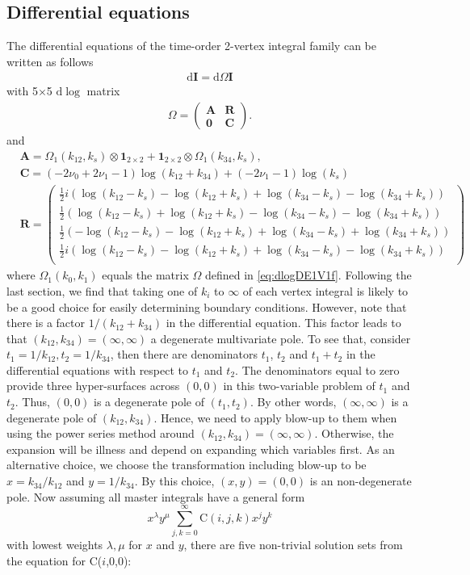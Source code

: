 \documentclass[a4paper,11pt]{article}
\newcommand{\nn}{\nonumber}
\newcommand{\nd}{\mathrm{d}}
\def\ie{\begin{equation}\begin{aligned}}
\def\fe{\end{aligned}\end{equation}}
\begin{document}
\subsection{Differential equations}
The differential equations of the time-order 2-vertex integral family can be written as follows
\ie
\nd \textbf{I}=\nd \Omega \textbf{I}
\fe
with 5$\times$5 $\nd\log$ matrix
\ie
\Omega=\begin{pmatrix} \mathbf{A} & \mathbf{R}\\ \mathbf{0} & \mathbf{C}\end{pmatrix}.
\fe
and
\ie
&\mathbf{A}=\Omega_1(k_{12},k_s)\otimes \mathbf{1}_{2\times2}+\mathbf{1}_{2\times2}\otimes\Omega_1(k_{34},k_s),\,~~~~\nn\\
&\mathbf{C}=(-2 \nu_0+2\nu_1-1) \log (k_{12}+k_{34})+(-2 \nu_1-1) \log (k_s)\\
&\mathbf{R}=\left(
\begin{array}{c}
 \frac{1}{2} i (\log (k_{12}-k_{s})-\log (k_{12}+k_{s})+\log (k_{34}-k_{s})-\log (k_{34}+k_{s})) \\
 \frac{1}{2} (\log (k_{12}-k_{s})+\log (k_{12}+k_{s})-\log (k_{34}-k_{s})-\log (k_{34}+k_{s})) \\
 \frac{1}{2} (-\log (k_{12}-k_{s})-\log (k_{12}+k_{s})+\log (k_{34}-k_{s})+\log (k_{34}+k_{s})) \\
 \frac{1}{2} i (\log (k_{12}-k_{s})-\log (k_{12}+k_{s})+\log (k_{34}-k_{s})-\log (k_{34}+k_{s})) \\
\end{array}
\right)  \label{eq:dlogDE2-v}
\fe
where $\Omega_1(k_0,k_1)$ equals the matrix $\Omega$ defined in \eqref{eq:dlogDE1V1f}. Following the last section, we find that taking one of $k_i$ to $\infty$ of each vertex integral is likely to be a good choice for easily determining boundary conditions. However, note that there is a factor $1/(k_{12}+k_{34})$ in the differential equation. This factor leads to that $(k_{12},k_{34})=(\infty,\infty)$ a degenerate multivariate pole. To see that, consider $t_1=1/k_{12}, t_2=1/k_{34}$, then there are denominators $t_1$, $t_2$ and $t_1+t_2$ in the differential equations with respect to $t_1$ and $t_2$. The denominators equal to zero provide three hyper-surfaces across $(0,0)$ in this two-variable problem of $t_1$ and $t_2$. Thus, $(0,0)$ is a degenerate pole of $(t_1,t_2)$. By other words, $(\infty,\infty)$ is a degenerate pole of $(k_{12},k_{34})$. Hence, we need to apply blow-up to them when using the power series method around  $(k_{12},k_{34})=(\infty,\infty)$. Otherwise, the expansion will be illness and depend on expanding which variables first. As an alternative choice, we choose the transformation including blow-up to be $x=k_{34}/k_{12}$ and $y=1/k_{34}$. By this choice, $(x,y)=(0,0)$ is an non-degenerate pole. Now assuming all master integrals have a general form $$x^{\lambda}y^{\mu}\sum_{j,k=0}^{\infty}\text{C}(i,j,k)x^jy^k$$ with lowest weights $\lambda,\mu$ for $x$ and $y$, there are five non-trivial solution sets from the equation for C($i$,0,0):
\end{document}
